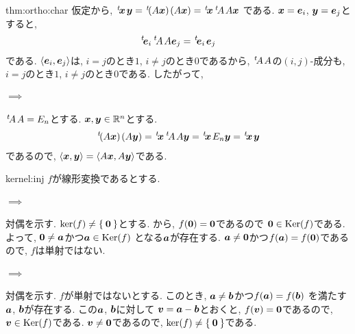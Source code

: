 \begin{proofof}{thm:ortho:char}
  仮定から,
  $\transposed{\xx}\yy=\transposed{(A\xx)}(A\xx)=\transposed{\xx}\transposed{A}A\xx$
  である.
  $\xx=\ee_i$, $\yy=\ee_j$とすると,
  \begin{align*}
    \transposed{\ee_i}\transposed{A}A\ee_j=\transposed{\ee_i}\ee_j
  \end{align*}
  である. $\Braket{\ee_i,\ee_j}$は, $i=j$のとき$1$, $i\neq j$のとき$0$であるから,
  $\transposed{A}A$の$(i,j)$-成分も, $i=j$のとき$1$, $i\neq j$のとき$0$である.
  したがって,
  
  \paragraph{$\implies$}

  $\transposed{A}A=E_n$とする.
  $\xx,\yy\in\RR^n$とする.
  \begin{align*}
    \transposed{(A\xx)}(A\yy)=\transposed{\xx}\transposed{A}A\yy=\transposed{\xx}E_n\yy=\transposed{\xx}\yy
  \end{align*}
  であるので,
  $\braket{\xx,\yy}=\braket{A\xx,A\yy}$である.
\end{proofof}


\begin{proofof}{kernel:inj}
$f$が線形変換であるとする.
\paragraph{$\implies$}
対偶を示す.
$\ker(f)\neq \Set{\zzero}$とする.
から, $f(\zzero)=\zzero$であるので
$\zzero\in \Ker(f)$である.
よって, $\zzero\neq \aaa$かつ$ \aaa\in\Ker(f)$
となる$\aaa$が存在する.
$\aaa\neq\zzero$かつ$f(\aaa)=f(\zzero)$であるので, $f$は単射ではない.

\paragraph{$\implies$}
対偶を示す.
$f$が単射ではないとする.
このとき,
$\aaa\neq\bbb$かつ$f(\aaa)=f(\bbb)$
を満たす$\aaa$, $\bbb$が存在する.
この$\aaa$, $\bbb$に対して
$\vv=\aaa-\bbb$とおくと,
$f(\vv)=\zzero$であるので,
$\vv\in \Ker(f)$である.
$\vv\neq \zzero$であるので,
$\ker(f)\neq \Set{\zzero}$である.

\end{proofof}


